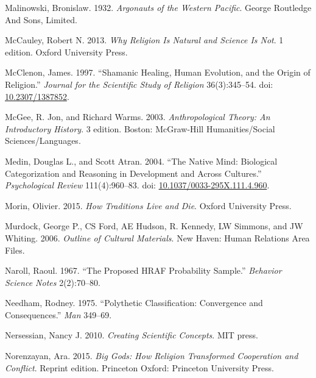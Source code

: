 \documentclass[
  11pt,
]{article}
\begin{document}
\leavevmode\hypertarget{ref-malinowskiArgonautsWesternPacific1932}{}%
Malinowski, Bronislaw. 1932. \emph{Argonauts of the Western Pacific}. George Routledge And Sons, Limited.

\leavevmode\hypertarget{ref-mccauleyWhyReligionNatural2013}{}%
McCauley, Robert N. 2013. \emph{Why Religion Is Natural and Science Is Not}. 1 edition. Oxford University Press.

\leavevmode\hypertarget{ref-mcclenonShamanicHealingHuman1997}{}%
McClenon, James. 1997. ``Shamanic Healing, Human Evolution, and the Origin of Religion.'' \emph{Journal for the Scientific Study of Religion} 36(3):345--54. doi: \href{https://doi.org/10.2307/1387852}{10.2307/1387852}.

\leavevmode\hypertarget{ref-mcgeeAnthropologicalTheoryIntroductory2003}{}%
McGee, R. Jon, and Richard Warms. 2003. \emph{Anthropological Theory: An Introductory History}. 3 edition. Boston: McGraw-Hill Humanities/Social Sciences/Languages.

\leavevmode\hypertarget{ref-medinNativeMindBiological2004}{}%
Medin, Douglas L., and Scott Atran. 2004. ``The Native Mind: Biological Categorization and Reasoning in Development and Across Cultures.'' \emph{Psychological Review} 111(4):960--83. doi: \href{https://doi.org/10.1037/0033-295X.111.4.960}{10.1037/0033-295X.111.4.960}.

\leavevmode\hypertarget{ref-morinHowTraditionsLive2015}{}%
Morin, Olivier. 2015. \emph{How Traditions Live and Die}. Oxford University Press.

\leavevmode\hypertarget{ref-murdockOutlineCulturalMaterials2006}{}%
Murdock, George P., CS Ford, AE Hudson, R. Kennedy, LW Simmons, and JW Whiting. 2006. \emph{Outline of Cultural Materials}. New Haven: Human Relations Area Files.

\leavevmode\hypertarget{ref-narollProposedHRAFProbability1967}{}%
Naroll, Raoul. 1967. ``The Proposed HRAF Probability Sample.'' \emph{Behavior Science Notes} 2(2):70--80.

\leavevmode\hypertarget{ref-needham1975polythetic}{}%
Needham, Rodney. 1975. ``Polythetic Classification: Convergence and Consequences.'' \emph{Man} 349--69.

\leavevmode\hypertarget{ref-nersessianCreatingScientificConcepts2010}{}%
Nersessian, Nancy J. 2010. \emph{Creating Scientific Concepts}. MIT press.

\leavevmode\hypertarget{ref-norenzayanBigGodsHow2015}{}%
Norenzayan, Ara. 2015. \emph{Big Gods: How Religion Transformed Cooperation and Conflict}. Reprint edition. Princeton Oxford: Princeton University Press.
\end{document}
